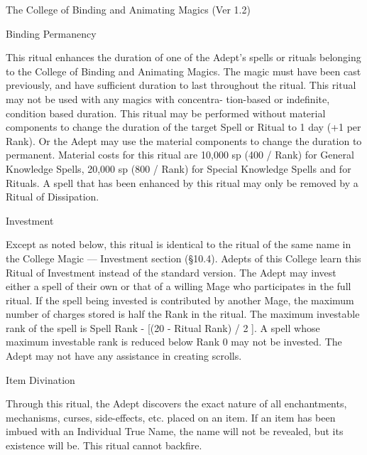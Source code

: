 \begin{Chapter}{The College of Binding and Animating Magics (Ver 1.2)}
\begin{ritual}[R-1]{Binding Permanency }
\begin{effects}
This ritual enhances the duration of one of the Adept’s spells or
rituals belonging to the College of Binding and Animating Magics. The
magic must have been cast previously, and have sufficient duration to
last throughout the ritual.  This ritual may not be used with any
magics with concentra- tion-based or indefinite, condition based
duration.  This ritual may be performed without material components to
change the duration of the target Spell or Ritual to 1 day (+1 per
Rank).  Or the Adept may use the material components to change the
duration to permanent.  Material costs for this ritual are 10,000 sp
(400 / Rank) for General Knowledge Spells, 20,000 sp (800 / Rank) for
Special Knowledge Spells and for Rituals.  A spell that has been
enhanced by this ritual may only be removed by a Ritual of
Dissipation.
\end{effects}
\end{ritual}

\begin{ritual}[R-2]{Investment}
\begin{effects}
Except as noted below, this ritual is identical to the ritual of the
same name in the College Magic — Investment section (§10.4).  Adepts
of this College learn this Ritual of Investment instead of the
standard version.  The Adept may invest either a spell of their own or
that of a willing Mage who participates in the full ritual. If the
spell being invested is contributed by another Mage, the maximum
number of charges stored is half the Rank in the ritual.  The maximum
investable rank of the spell is Spell Rank - [(20 - Ritual Rank) / 2
].  A spell whose maximum investable rank is reduced below Rank 0 may
not be invested. The Adept may not have any assistance in creating
scrolls.
\end{effects}
\end{ritual}

\begin{ritual}[R-3]{Item Divination}
\begin{effects}
Through this ritual, the Adept discovers the exact nature of all
enchantments, mechanisms, curses, side-effects, etc.  placed on an
item.  If an item has been imbued with an Individual True Name, the
name will not be revealed, but its existence will be. This ritual
cannot backfire.
\end{effects}
\end{ritual}


\end{Chapter}

